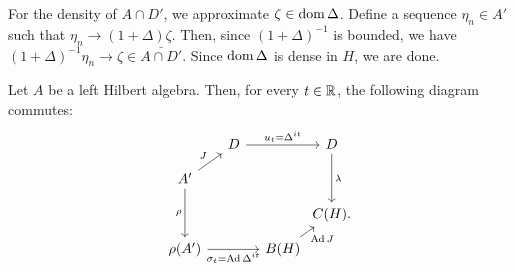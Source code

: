 \documentclass{../../../small}
\begin{document}
\begin{pf}
For the density of $A\cap D'$, we approximate $\zeta\in\operatorname{dom}\Delta$.
Define a sequence $\eta_n\in A'$ such that $\eta_n\to(1+\Delta)\zeta$.
Then, since $(1+\Delta)^{-1}$ is bounded, we have $(1+\Delta)^{-1}\eta_n\to\zeta\in\bar{A\cap D'}$.
Since $\operatorname{dom}\Delta$ is dense in $H$, we are done.
\end{pf}


\begin{thm}
Let $A$ be a left Hilbert algebra.
Then, for every $t\in\mathbb{R}$, the following diagram commutes:
\[\begin{tikzcd}[column sep={3.5em,between origins},row sep={2.5em,between origins}]
&D\ar{rr}{u_t=\Delta^{it}}&&D\ar{dd}{\lambda}\\
A'\ar{ur}{J}\ar[swap]{dd}{\rho}&&&\\
&&&C(H).\\
\rho(A')\ar[swap]{rr}{\sigma_t=\Ad\Delta^{it}}&&B(H)\ar[swap]{ur}{\Ad J}&
\end{tikzcd}\]
\end{thm}
\end{document}
